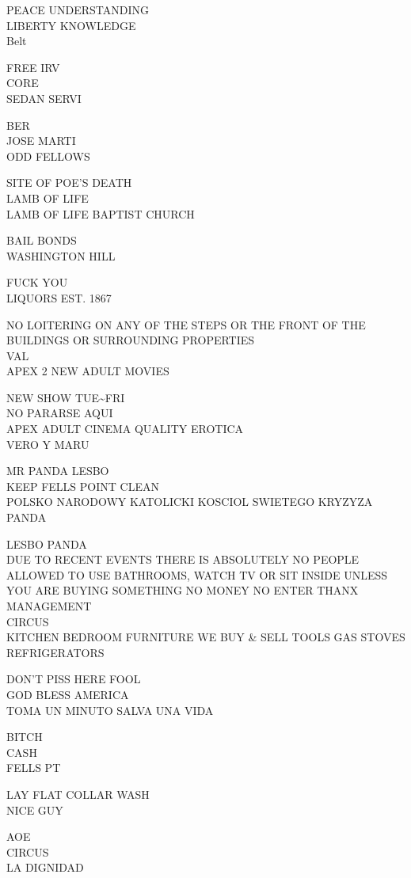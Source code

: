 \documentclass[10pt,letterpaper]{article}
\begin{document}
PEACE UNDERSTANDING\\
LIBERTY KNOWLEDGE\\
Belt

FREE IRV\\
CORE\\
SEDAN SERVI

BER\\
JOSE MARTI\\
ODD FELLOWS

SITE OF POE'S DEATH\\
LAMB OF LIFE\\
LAMB OF LIFE BAPTIST CHURCH

BAIL BONDS\\
WASHINGTON HILL

FUCK YOU\\
LIQUORS EST. 1867

NO LOITERING ON ANY OF THE STEPS OR THE FRONT OF THE BUILDINGS OR SURROUNDING PROPERTIES\\
VAL\\
APEX 2 NEW ADULT MOVIES

NEW SHOW TUE\textasciitilde{}FRI\\
NO PARARSE AQUI\\
APEX ADULT CINEMA QUALITY EROTICA\\
VERO Y MARU

MR PANDA LESBO\\
KEEP FELLS POINT CLEAN\\
POLSKO NARODOWY KATOLICKI KOSCIOL SWIETEGO KRYZYZA\\
PANDA

LESBO PANDA\\
DUE TO RECENT EVENTS THERE IS ABSOLUTELY NO PEOPLE ALLOWED TO USE BATHROOMS, WATCH TV OR SIT INSIDE UNLESS YOU ARE BUYING SOMETHING NO MONEY NO ENTER THANX MANAGEMENT\\
CIRCUS\\
KITCHEN BEDROOM FURNITURE WE BUY \& SELL TOOLS GAS STOVES REFRIGERATORS

DON'T PISS HERE FOOL\\
GOD BLESS AMERICA\\
TOMA UN MINUTO SALVA UNA VIDA

BITCH\\
CASH\\
FELLS PT

LAY FLAT COLLAR WASH\\
NICE GUY

AOE\\
CIRCUS\\
LA DIGNIDAD
\end{document}
